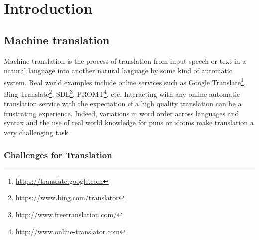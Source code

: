 \chapter{Introduction}

\section{Machine translation}



Machine translation is the process of translation from input
speech or text in a natural language into another natural language
by some kind of automatic system.
Real world examples include online services such as
Google Translate\footnote{\url{https://translate.google.com}},
Bing Translate\footnote{\url{https://www.bing.com/translator}},
SDL\footnote{\url{http://www.freetranslation.com/}},
PROMT\footnote{\url{http://www.online-translator.com}}, etc.
Interacting with any online automatic translation service with
the expectation of a high quality translation can be a frustrating
experience. Indeed, variations
in word order across languages and syntax and the use of real world knowledge
for puns or idioms make translation a very challenging task.

\subsection{Challenges for Translation}

